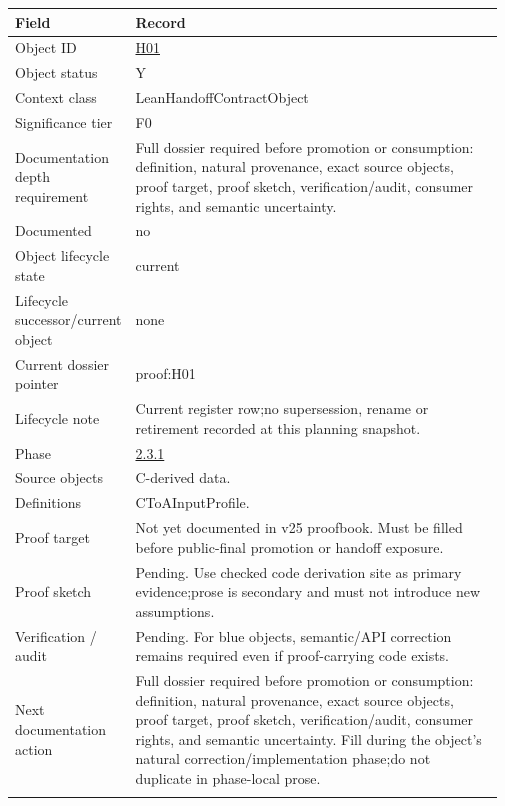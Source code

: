 \begin{longtable}{L{0.16\linewidth} L{0.81\linewidth}}
\hline
\textbf{Field} & \textbf{Record}\\
\hline
Object ID & \hyperlink{object-row-H01}{H01}\\
\hline\addlinespace[0.20em]
Object status & Y\\
\hline\addlinespace[0.20em]
Context class & LeanHandoffContractObject\\
\hline\addlinespace[0.20em]
Significance tier & F0\\
\hline\addlinespace[0.20em]
Documentation depth requirement & Full dossier required before promotion or consumption: definition, natural provenance, exact source objects, proof target, proof sketch, verification/\allowbreak{}audit, consumer rights, and semantic uncertainty.\\
\hline\addlinespace[0.20em]
Documented & no\\
\hline\addlinespace[0.20em]
Object lifecycle state & current\\
\hline\addlinespace[0.20em]
Lifecycle successor/\allowbreak{}current object & none\\
\hline\addlinespace[0.20em]
Current dossier pointer & proof:H01\\
\hline\addlinespace[0.20em]
Lifecycle note & Current register row;\newline no supersession, rename or retirement recorded at this planning snapshot.\\
\hline\addlinespace[0.20em]
Phase & \hyperlink{phase-row-2-3-1}{2.3.1}\\
\hline\addlinespace[0.20em]
Source objects & C-derived data.\\
\hline\addlinespace[0.20em]
Definitions & CToAInputProfile.\\
\hline\addlinespace[0.20em]
Proof target & Not yet documented in v25 proofbook. Must be filled before public-final promotion or handoff exposure.\\
\hline\addlinespace[0.20em]
Proof sketch & Pending. Use checked code derivation site as primary evidence;\newline prose is secondary and must not introduce new assumptions.\\
\hline\addlinespace[0.20em]
Verification /\allowbreak{} audit & Pending. For blue objects, semantic/\allowbreak{}API correction remains required even if proof-carrying code exists.\\
\hline\addlinespace[0.20em]
Next documentation action & Full dossier required before promotion or consumption: definition, natural provenance, exact source objects, proof target, proof sketch, verification/\allowbreak{}audit, consumer rights, and semantic uncertainty. Fill during the object's natural correction/\allowbreak{}implementation phase;\newline do not duplicate in phase-local prose.\\
\hline\addlinespace[0.20em]
\end{longtable}
